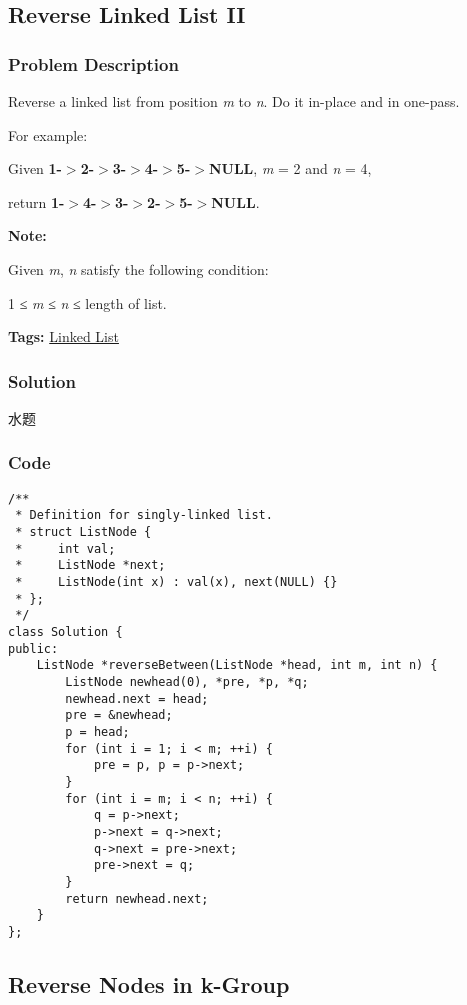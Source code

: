 \documentclass{article}
\begin{document}
\begin{CJK*}{UTF8}{gkai}
\subsection{ Reverse Linked List II }
\label{ Reverse Linked List II }

\subsubsection*{Problem Description}
Reverse a linked list from position \emph{m} to \emph{n}. Do it in-place and in one-pass.

For example:


Given \textbf{1-$>$2-$>$3-$>$4-$>$5-$>$NULL}, \emph{m} = 2 and \emph{n} = 4,

return \textbf{1-$>$4-$>$3-$>$2-$>$5-$>$NULL}.

\textbf{Note:}


Given \emph{m}, \emph{n} satisfy the following condition:


1 ≤ \emph{m} ≤ \emph{n} ≤ length of list.


\textbf{Tags: }
\hyperref[ Linked List ]{ Linked List }



\subsubsection*{Solution}
水题

\subsubsection*{Code}
\begin{lstlisting}
/**
 * Definition for singly-linked list.
 * struct ListNode {
 *     int val;
 *     ListNode *next;
 *     ListNode(int x) : val(x), next(NULL) {}
 * };
 */
class Solution {
public:
    ListNode *reverseBetween(ListNode *head, int m, int n) {
        ListNode newhead(0), *pre, *p, *q;
        newhead.next = head;
        pre = &newhead;
        p = head;
        for (int i = 1; i < m; ++i) {
            pre = p, p = p->next;
        }
        for (int i = m; i < n; ++i) {
            q = p->next;
            p->next = q->next;
            q->next = pre->next;
            pre->next = q;
        }
        return newhead.next;
    }
}; 
\end{lstlisting}


\subsection{ Reverse Nodes in k-Group }
\label{ Reverse Nodes in k-Group }


\end{CJK*}
\end{document}
